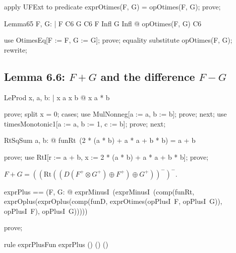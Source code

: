 \documentclass{article}
\begin{document}
\begin{zproof}
apply UFExt to predicate exprOtimes(F, G) = opOtimes(F, G);
prove;
\end{zproof}

\begin{theorem}{Lemma65}
  \forall F, G: \nat \fun \nat | F \in C6 \land G \in C6 \land F \in Infl \land G \in Infl @
    opOtimes(F, G) \in C6
\end{theorem}

\begin{zproof}
use OtimesEq[F := F, G := G];
prove;
equality substitute opOtimes(F, G);
rewrite;
\end{zproof}

\subsection{Lemma 6.6: $F + G$ and the difference $F - G$}

\begin{theorem}{LeProd}
  \forall x, a, b: \nat | x \leq a \land x \leq b @ x \leq a * b
\end{theorem}

\begin{zproof}
prove;
split x = 0;
cases;
use MulNonneg[a := a, b := b];
prove;
next;
use timesMonotonic1[a := a, b := 1, c := b];
prove;
next;
\end{zproof}

\begin{theorem}{RtSqSum}
  \forall a, b: \nat @ funRt~(2 * (a * b) + a * a + b * b) = a + b
\end{theorem}

\begin{zproof}
prove;
use RtI[r := a + b, x := 2 * (a * b) + a * a + b * b];
prove;
\end{zproof}

$F + G = ((\mathrm{Rt}((D(F^+ \otimes G^+) \oplus F^+) \oplus G^+))^-)^-$.

\begin{zed}
  exprPlus == (\lambda F, G: \nat \fun \nat @ exprMinusI~(exprMinusI~(comp(funRt, exprOplus(exprOplus(comp(funD, exprOtimes(opPlusI~F, opPlusI~G)), opPlusI~F), opPlusI~G)))))
\end{zed}

\begin{zproof}
prove;
\end{zproof}

\begin{theorem}{rule exprPlusFun}
  exprPlus \in (\nat \fun \nat) \cross (\nat \fun \nat) \fun (\nat \fun \nat)
\end{theorem}
\end{document}
